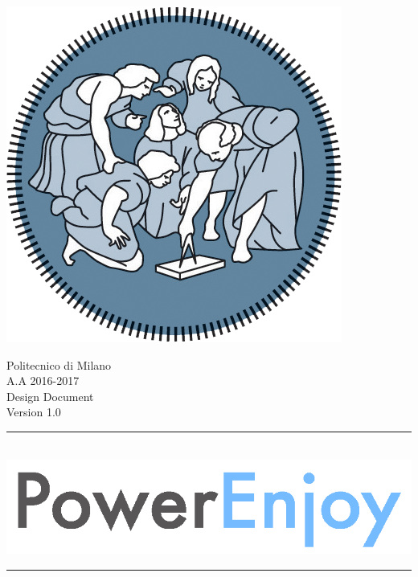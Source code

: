 \documentclass[12pt]{article}
\begin{document}
   
	\begin{center}
 	 	\includegraphics[scale=1.5]{Images/PolimiLogo.png}
	\end{center}

	\begin{center}
	 	{\Huge Politecnico di Milano}\\
	 	\vspace{5mm}
		{\Large A.A 2016-2017} 
		\vspace{5mm}\\
		{\huge Design Document}   
		\vspace{5mm}\\
		{\large Version 1.0}  
    \end{center}
     
    \begin{center}
		\noindent\rule{8cm}{0.8pt}
		 \vspace{5mm}\\
 	 	 \includegraphics[scale=1]{Images/logoPowerEnjoy2.png}\\
		\noindent\rule{8cm}{0.8pt}
	\end{center}
	 	\vspace{5mm}
	 		
\end{document}
